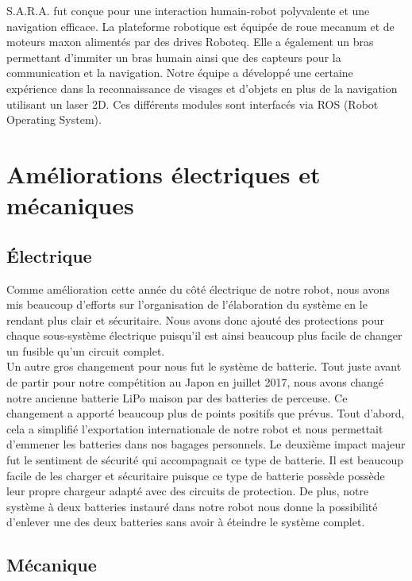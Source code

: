 \documentclass[runningheads,a4paper]{llncs}
\begin{document}
S.A.R.A. fut conçue pour une interaction humain-robot polyvalente et une navigation efficace. La plateforme robotique est équipée de roue mecanum et de moteurs maxon alimentés par des drives Roboteq. Elle a également un bras permettant d'immiter un bras humain ainsi que des capteurs pour la communication et la navigation. Notre équipe a développé une certaine expérience dans la reconnaissance de visages et d'objets en plus de la navigation utilisant un laser 2D. Ces différents modules sont interfacés via ROS (Robot Operating System). \\

\section{Améliorations électriques et mécaniques}
\subsection{Électrique}

Comme amélioration cette année du côté électrique de notre robot, nous avons mis beaucoup d'efforts sur l'organisation de l'élaboration du système en le rendant plus clair et sécuritaire. Nous avons donc ajouté des protections pour chaque sous-système électrique puisqu'il est ainsi beaucoup plus facile de changer un fusible qu'un circuit complet. \\

Un autre gros changement pour nous fut le système de batterie. Tout juste avant de partir pour notre compétition au Japon en juillet 2017, nous avons changé notre ancienne batterie LiPo maison par des batteries de perceuse. Ce changement a apporté beaucoup plus de points positifs que prévus. Tout d'abord, cela a simplifié l'exportation internationale de notre robot et nous permettait d'emmener les batteries dans nos bagages personnels. Le deuxième impact majeur fut le sentiment de sécurité qui accompagnait ce type de batterie. Il est beaucoup facile de les charger et sécuritaire puisque ce type de batterie possède possède leur propre chargeur adapté avec des circuits de protection. De plus, notre système à deux batteries instauré dans  notre robot nous donne la possibilité d'enlever une des deux batteries sans avoir à éteindre le système complet.\\



\subsection{Mécanique}
\end{document}
